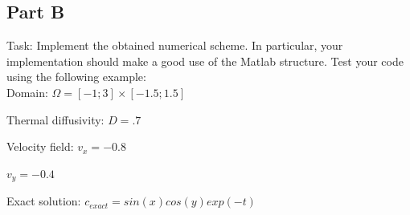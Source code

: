 \documentclass[12pt]{article}
\begin{document}
\subsection*{Part B}
Task: Implement the obtained numerical scheme. In particular, your implementation should make a good use of the Matlab  structure. Test your code using the following example:
\\

\hspace{4.2cm}Domain:\hspace{2.2cm} $\Omega = [-1;3] \times [-1.5;1.5]$

\hspace{2.15cm}Thermal diffusivity: \hspace{2cm} $D = .7$

\hspace{3.27cm}Velocity field: \hspace{2cm} $v_x = -0.8$

\hspace{8cm} $v_y = -0.4$

\hspace{2.88cm} Exact solution: \hspace{2cm} $c_{exact} = sin(x)cos(y)exp(-t)$
\\
\end{document}
